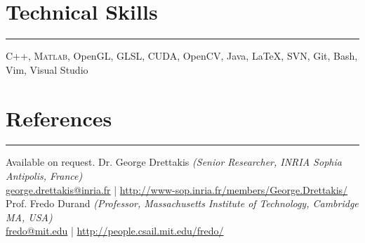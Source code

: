 \documentclass[10pt]{article}
\newcommand{\notes}[1]{\marginnote{\color{Gray}\scriptsize #1}}
\newcommand{\customsection}[1]{\section*{#1}\vspace{-0.2cm}\hrule\vspace{0.1cm}}
\begin{document}

\customsection{Technical Skills}
\noindent
C++, {\scshape Matlab}, OpenGL, GLSL, CUDA, OpenCV, Java, \LaTeX, SVN, Git, Bash, Vim, Visual Studio

\customsection{References}
{%
Available on request.
}{%
Dr. George Drettakis {\itshape (Senior Researcher, INRIA Sophia Antipolis, France)} \\
\href{mailto:george.drettakis@inria.fr}{george.drettakis@inria.fr} |
\href{http://www-sop.inria.fr/members/George.Drettakis/}{http://www-sop.inria.fr/members/George.Drettakis/} \\[0.3cm]
%
Prof. Fredo Durand {\itshape (Professor, Massachusetts Institute of Technology, Cambridge MA, USA)} \\
\href{mailto:fredo@mit.edu}{fredo@mit.edu} |
\href{http://people.csail.mit.edu/fredo/}{http://people.csail.mit.edu/fredo/} \\[0.3cm]
%
%
}
\end{document}
